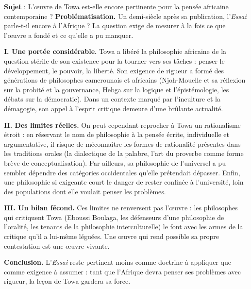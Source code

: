\documentclass[11pt]{article}
\begin{document}
\begin{exoresolu}
\textbf{Sujet} : L'œuvre de Towa est-elle encore pertinente pour la pensée africaine contemporaine ?
\tcblower
\textbf{Problématisation.} Un demi-siècle après sa publication, l'\emph{Essai} parle-t-il encore à l'Afrique ? La question exige de mesurer à la fois ce que l'œuvre a fondé et ce qu'elle a pu manquer.

\textbf{I. Une portée considérable.} Towa a libéré la philosophie africaine de la question stérile de son existence pour la tourner vers ses tâches : penser le développement, le pouvoir, la liberté. Son exigence de rigueur a formé des générations de philosophes camerounais et africains (Njoh-Mouelle et sa réflexion sur la probité et la gouvernance, Hebga sur la logique et l'épistémologie, les débats sur la démocratie). Dans un contexte marqué par l'inculture et la démagogie, son appel à l'esprit critique demeure d'une brûlante actualité.

\textbf{II. Des limites réelles.} On peut cependant reprocher à Towa un rationalisme étroit : en réservant le nom de philosophie à la pensée écrite, individuelle et argumentative, il risque de méconnaître les formes de rationalité présentes dans les traditions orales (la dialectique de la palabre, l'art du proverbe comme forme brève de conceptualisation). Par ailleurs, sa philosophie de l'universel a pu sembler dépendre des catégories occidentales qu'elle prétendait dépasser. Enfin, une philosophie si exigeante court le danger de rester confinée à l'université, loin des populations dont elle voulait penser les problèmes.

\textbf{III. Un bilan fécond.} Ces limites ne renversent pas l'œuvre : les philosophes qui critiquent Towa (Eboussi Boulaga, les défenseurs d'une philosophie de l'oralité, les tenants de la philosophie interculturelle) le font avec les armes de la critique qu'il a lui-même léguées. Une œuvre qui rend possible sa propre contestation est une œuvre vivante.

\textbf{Conclusion.} L'\emph{Essai} reste pertinent moins comme doctrine à appliquer que comme exigence à assumer : tant que l'Afrique devra penser ses problèmes avec rigueur, la leçon de Towa gardera sa force.
\end{exoresolu}
\end{document}
